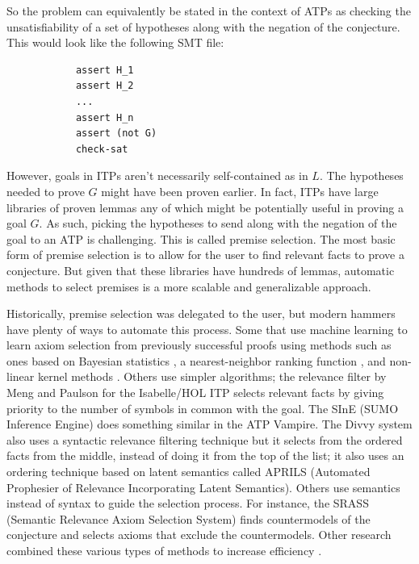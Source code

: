 \documentclass{article}
\begin{document}
		So the problem can equivalently be stated in the context of ATPs
		as checking the unsatisfiability of a set of hypotheses 
		along with the negation of the conjecture. This would look 
		like the following SMT file:
		\begin{verbatim}
			assert H_1
			assert H_2
			...
			assert H_n
			assert (not G)
			check-sat
		\end{verbatim}
		However, goals in ITPs aren't necessarily self-contained 
		as in $L$. The hypotheses needed to prove $G$ 
		might have been proven earlier. In fact, ITPs have large
		libraries of proven lemmas any of which might be potentially 
		useful in proving a goal $G$. As such, picking
		the hypotheses to send along with the negation of the 
		goal to an ATP is challenging. This is called premise 
		selection. The most basic form of premise selection 
		is to allow for the user to find relevant facts 
		to prove a conjecture. But given that these libraries 
		have hundreds of lemmas, automatic methods to select 
		premises is a more scalable and generalizable approach.
	
		Historically, premise selection was delegated to the 
		user, but modern hammers have plenty of ways to 
		automate this process. Some that use machine learning
		to learn axiom selection from previously successful 
		proofs using methods such as ones based on 
		Bayesian statistics \cite{DBLP:journals/jar/AlamaHKTU14}, 
		a nearest-neighbor ranking function 
		\cite{DBLP:conf/cade/KaliszykU13a}, and non-linear 
		kernel methods \cite{DBLP:journals/jar/AlamaHKTU14}.
		Others use simpler algorithms; the relevance filter 
		by Meng and Paulson 
		\cite{DBLP:journals/japll/MengP09}
		for the Isabelle/HOL ITP selects relevant facts by 
		giving priority to the number of symbols in common 
		with the goal. The SInE (SUMO Inference Engine) 
		\cite{10.1007/978-3-642-22438-6_23} does something 
		similar in the ATP Vampire. The Divvy system 
		\cite{10.1007/978-3-642-02959-2_13} also uses a 
		syntactic relevance filtering technique but it 
		selects from the ordered facts from the middle, 
		instead of doing it from the top of the list; it
		also uses an ordering technique based 
		on latent semantics called APRILS (Automated 
		Prophesier of Relevance Incorporating Latent Semantics).
		Others use semantics instead of syntax to guide
		the selection process. For instance, the SRASS 
		(Semantic Relevance Axiom Selection System) 
		\cite{10.1007/978-3-540-73595-3_20} finds 
		countermodels of the conjecture and selects axioms that
		exclude the countermodels. Other research combined
		these various types of methods to increase efficiency 
		\cite{DBLP:journals/corr/KaliszykU13b, 
			10.1007/978-3-642-31365-3_30}.
		
\end{document}
